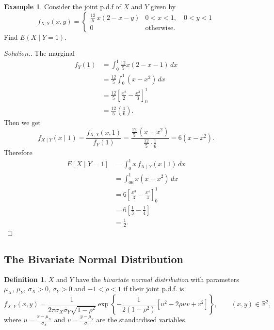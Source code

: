 \documentclass[12pt,a4paper]{report}
\theoremstyle{definition}
\newtheorem{definition}[thm]{Definition}
\newtheorem{example}[thm]{Example}
\theoremstyle{plain}
\theoremstyle{definition}
\begin{document}
\begin{example}
Consider the joint p.d.f of $X$ and $Y$ given by \[f_{X,Y}(x,y) = \begin{cases}
\frac{12}{5}\,x(2 - x - y) & 0 <  x < 1, \quad 0 < y < 1\\
0 & \text{otherwise}.
\end{cases}\]
Find $E(X\mid Y = 1)$.
\begin{proof}[\textit{Solution}.]
The marginal
\begin{align*}
f_Y(1) & = \int_0^1\frac{12}{5}x(2-x-1)\, dx\\\
 & = \frac{12}{5}\int^1_0(x - x^2)\, dx\\
 & = \frac{12}{5}\left[\frac{x^2}{2}-\frac{x^3}{3}\right]^1_0\\
 & = \frac{12}{5}\left(\frac{1}{6}\right).
\end{align*}
Then we get \[f_{X\mid Y}(x\mid 1) = \frac{f_{X,Y}(x,1)}{f_Y(1)}= \frac{\frac{12}{5}\, (x-x^2)}{\frac{12}{5}\cdot\frac{1}{6}} = 6(x - x^2).\]
Therefore
\begin{align*}
E[X\mid Y = 1] &  = \int^1_0x\, f_{X\mid Y}(x\mid 1)\, dx\\
& = \int^1_06x(x - x^2)\, dx\\
& = 6\left[\frac{x^3}{3} - \frac{x^4}{4}\right]^1_0\\
& = 6\left[\frac{1}{3}-\frac{1}{4}\right]\\
& = \frac{1}{2}.
\end{align*}
\end{proof}
\end{example}





\subsection{The Bivariate Normal Distribution}
\label{ssec:bivariatenormal}

\begin{definition}
\label{def:bivariatenormal}
$X$ and $Y$ have the \emph{bivariate normal distribution} with parameters $\mu_X$,
$\mu_Y$, $\sigma_X>0$, $\sigma_Y>0$ and $-1<\rho<1$ if their joint p.d.f. is
\[f_{X,Y}(x,y) = \frac{1}{2\pi\sigma_X\sigma_Y\sqrt{1 - \rho^2}}\exp\left\{-\frac{1}{2(1 - \rho^2)}\left[u^2 - 2\rho uv + v^2\right]\right\},\qquad (x, y)\in\mathbb{R}^2,\]
where $u = \frac{x - \mu_X}{\sigma_X}$ and $v = \frac{y - \mu_Y}{\sigma_Y}$ are the standardised
variables.
\end{definition}
\end{document}

